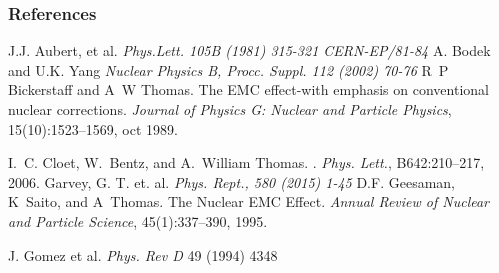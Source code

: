 \documentclass[12pt,usenames,dvipsnames]{beamer}
\begin{document}
\begin{frame}[allowframebreaks]
\vspace*{-3pt}
\frametitle{References}
\footnotesize{
	\begin{thebibliography}{9} %
		\vspace*{-20pt}
		 J.J. Aubert, et al.
		\newblock \emph{Phys.Lett. 105B (1981) 315-321 CERN-EP/81-84}
		\vspace*{-8pt}		
		 A. Bodek and U.K. Yang
		\newblock \emph{Nuclear Physics B, Procc. Suppl. 112 (2002) 70-76 }			
\vspace*{-8pt}
		  R~P Bickerstaff and A~W Thomas.
\newblock The {EMC} effect-with emphasis on conventional nuclear corrections.
{\em Journal of Physics G: Nuclear and Particle Physics},
15(10):1523--1569, oct 1989.
\vspace*{-8pt}

I.~C. Cloet, W.~Bentz, and A.~William Thomas.
.
{\em Phys. Lett.}, B642:210--217, 2006.
\vspace*{-8pt}
		 Garvey, G. T. et. al.
		\newblock \emph{Phys. Rept., 580 (2015) 1-45 }	
\vspace*{-8pt}		
		   D.F. Geesaman, K~Saito, and A~Thomas.
		\newblock The Nuclear EMC Effect. {\em Annual Review of Nuclear and Particle Science}, 45(1):337--390,
		1995.
		
\vspace*{-8pt}		
		 J. Gomez et al.   
		\newblock \emph{Phys. Rev D}  49 (1994) 4348 


\end{thebibliography}}
\end{frame}
\end{document}

